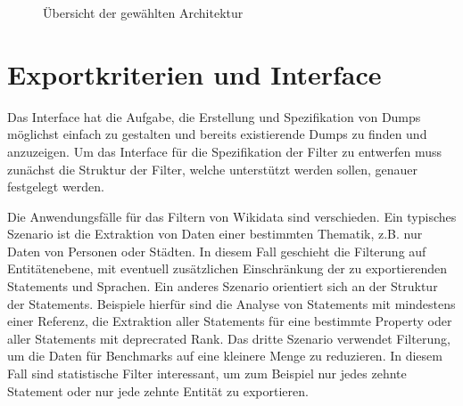 \begin{figure}
  
  \caption{Übersicht der gewählten Architektur}
  \label{fig:arch}
\end{figure}

\section{Exportkriterien und Interface}
Das Interface hat die Aufgabe, die Erstellung und Spezifikation von Dumps möglichst einfach zu gestalten und bereits existierende Dumps zu finden und anzuzeigen.
Um das Interface für die Spezifikation der Filter zu entwerfen muss zunächst die Struktur der Filter, welche unterstützt werden sollen, genauer festgelegt werden.

Die Anwendungsfälle für das Filtern von Wikidata sind verschieden.
Ein typisches Szenario ist die Extraktion von Daten einer bestimmten Thematik, z.B. nur Daten von Personen oder Städten.
In diesem Fall geschieht die Filterung auf Entitätenebene, mit eventuell zusätzlichen Einschränkung der zu exportierenden Statements und Sprachen.
Ein anderes Szenario orientiert sich an der Struktur der Statements.
Beispiele hierfür sind die Analyse von Statements mit mindestens einer Referenz, die Extraktion aller Statements für eine bestimmte Property oder aller Statements mit deprecrated Rank.
Das dritte Szenario verwendet Filterung, um die Daten für Benchmarks auf eine kleinere Menge zu reduzieren.
In diesem Fall sind statistische Filter interessant, um zum Beispiel nur jedes zehnte Statement oder nur jede zehnte Entität zu exportieren.

